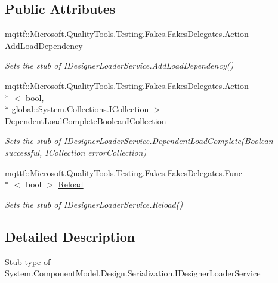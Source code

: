 \subsection*{Public Attributes}
\begin{DoxyCompactItemize}
\item 
mqttf\-::\-Microsoft.\-Quality\-Tools.\-Testing.\-Fakes.\-Fakes\-Delegates.\-Action \hyperlink{class_system_1_1_component_model_1_1_design_1_1_serialization_1_1_fakes_1_1_stub_i_designer_loader_service_a0e7f42b98653a7966d03d7ad47ac40cd}{Add\-Load\-Dependency}
\begin{DoxyCompactList}\small\item\em Sets the stub of I\-Designer\-Loader\-Service.\-Add\-Load\-Dependency()\end{DoxyCompactList}\item 
mqttf\-::\-Microsoft.\-Quality\-Tools.\-Testing.\-Fakes.\-Fakes\-Delegates.\-Action\\*
$<$ bool, \\*
global\-::\-System.\-Collections.\-I\-Collection $>$ \hyperlink{class_system_1_1_component_model_1_1_design_1_1_serialization_1_1_fakes_1_1_stub_i_designer_loader_service_a3cad1d74873975c36d9f5fbec8b35b9f}{Dependent\-Load\-Complete\-Boolean\-I\-Collection}
\begin{DoxyCompactList}\small\item\em Sets the stub of I\-Designer\-Loader\-Service.\-Dependent\-Load\-Complete(\-Boolean successful, I\-Collection error\-Collection)\end{DoxyCompactList}\item 
mqttf\-::\-Microsoft.\-Quality\-Tools.\-Testing.\-Fakes.\-Fakes\-Delegates.\-Func\\*
$<$ bool $>$ \hyperlink{class_system_1_1_component_model_1_1_design_1_1_serialization_1_1_fakes_1_1_stub_i_designer_loader_service_a908851278e71e5c7beff6364ce962e18}{Reload}
\begin{DoxyCompactList}\small\item\em Sets the stub of I\-Designer\-Loader\-Service.\-Reload()\end{DoxyCompactList}\end{DoxyCompactItemize}


\subsection{Detailed Description}
Stub type of System.\-Component\-Model.\-Design.\-Serialization.\-I\-Designer\-Loader\-Service



